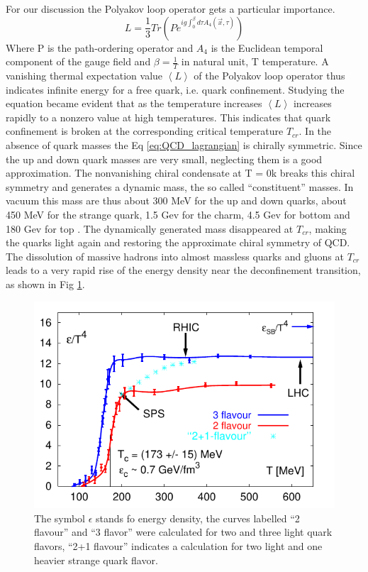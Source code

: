 \documentclass[12pt,a4paper]{book}
\begin{document}
	For our discussion the Polyakov loop operator gets a particular importance. 
	\begin{equation}
		L=\frac{1}{3} Tr \left(P e^{ig \int_{0}^{\beta} d\tau A_4(\vec{x},\tau) } \right)
		\label{eq:Polyakov-loop}
	\end{equation}
	Where P is the path-ordering operator and $A_4$ is the Euclidean temporal component of the gauge field and $\beta= \frac{1}{T}$ in natural unit, T temperature. A vanishing thermal expectation value $\left<L\right>$ of the Polyakov loop operator thus indicates infinite energy for a free quark, i.e. quark confinement. Studying the equation became evident that as the temperature increases $\left<L\right>$ increases rapidly to a nonzero value at high temperatures. This indicates that quark confinement is broken at the corresponding critical temperature $T_{cr}$. In the absence of quark masses the Eq \ref{eq:QCD_lagrangian} is chirally symmetric. Since the up and down quark masses are very small, neglecting them is a good approximation. The nonvanishing chiral condensate at T = 0k breaks this chiral symmetry and generates a dynamic mass, the so called “constituent” masses. In vacuum this mass are thus about 300 MeV for the up and down quarks, about 450 MeV for the strange quark, 1.5 Gev for the charm, 4.5 Gev for bottom and 180 Gev for top \cite{Semprini}. The dynamically generated mass disappeared at $T_{cr}$, making the quarks light again and restoring the approximate chiral symmetry of QCD. The dissolution of massive hadrons into almost massless quarks and gluons at $T_{cr}$ leads to a very rapid rise of the energy density near the deconfinement transition, as shown in Fig \ref{fig:deconfinement}.
	\begin{figure}[ht]
		\centering
		\includegraphics[width=0.7\linewidth]{pictures/deconfinement.png}
		\caption{The symbol $\epsilon$ stands fo energy density, the curves labelled “2 flavour” and “3 flavor” were calculated for two and three light quark flavors, “2+1 flavour” indicates a calculation for two light and one heavier strange quark flavor.}
		\label{fig:deconfinement} 
	\end{figure}
\end{document}
